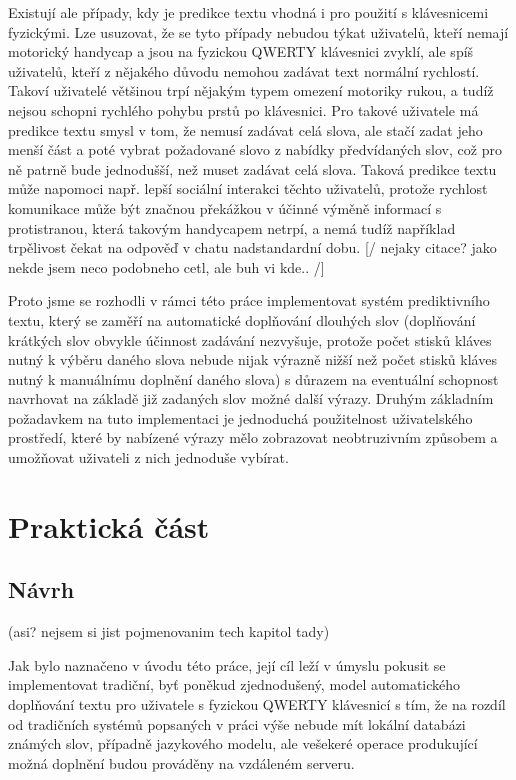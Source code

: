 \documentclass{article}
\begin{document}
Existují ale případy, kdy je predikce textu vhodná i pro použití s klávesnicemi fyzickými. Lze usuzovat, že se tyto případy nebudou týkat uživatelů, kteří nemají motorický handycap a jsou na fyzickou QWERTY klávesnici zvyklí, ale spíš uživatelů, kteří z nějakého důvodu nemohou zadávat text normální rychlostí. Takoví uživatelé většinou trpí nějakým typem omezení motoriky rukou, a tudíž nejsou schopni rychlého pohybu prstů po klávesnici. Pro takové uživatele má predikce textu smysl v tom, že nemusí zadávat celá slova, ale stačí zadat jeho menší část a poté vybrat požadované slovo z nabídky předvídaných slov, což pro ně patrně bude jednodušší, než muset zadávat celá slova. Taková predikce textu může napomoci např. lepší sociální interakci těchto uživatelů, protože rychlost komunikace může být značnou překážkou v účinné výměně informací s protistranou, která takovým handycapem netrpí, a nemá tudíž například trpělivost čekat na odpověď v chatu nadstandardní dobu. [/ nejaky citace? jako nekde jsem neco podobneho cetl, ale buh vi kde..   /]

Proto jsme se rozhodli v rámci této práce implementovat systém prediktivního textu, který se zaměří na automatické doplňování dlouhých slov (doplňování krátkých slov obvykle účinnost zadávání nezvyšuje, protože počet stisků kláves nutný k výběru daného slova nebude nijak výrazně nižší než počet stisků kláves nutný k manuálnímu doplnění daného slova) s důrazem na eventuální schopnost navrhovat na základě již zadaných slov možné další výrazy. Druhým základním požadavkem na tuto implementaci je jednoduchá použitelnost uživatelského prostředí, které by nabízené výrazy mělo zobrazovat neobtruzivním způsobem a umožňovat uživateli z nich jednoduše vybírat.



\section{Praktická část}

\subsection{Návrh} (asi? nejsem si jist pojmenovanim tech kapitol tady)

Jak bylo naznačeno v úvodu této práce, její cíl leží v úmyslu pokusit se implementovat tradiční, byť poněkud zjednodušený, model automatického doplňování textu pro uživatele s fyzickou QWERTY klávesnicí s tím, že na rozdíl od tradičních systémů popsaných v práci výše nebude mít lokální databázi známých slov, případně jazykového modelu, ale vešekeré operace produkující možná doplnění budou prováděny na vzdáleném serveru.
\end{document}
